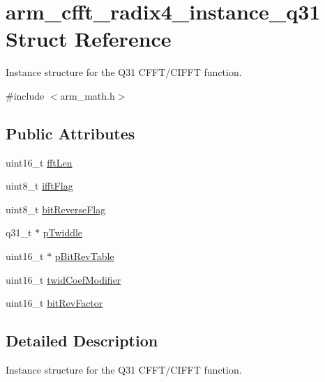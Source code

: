 \hypertarget{structarm__cfft__radix4__instance__q31}{\section{arm\-\_\-cfft\-\_\-radix4\-\_\-instance\-\_\-q31 Struct Reference}
\label{structarm__cfft__radix4__instance__q31}
}


Instance structure for the Q31 C\-F\-F\-T/\-C\-I\-F\-F\-T function.  




{\ttfamily \#include $<$arm\-\_\-math.\-h$>$}

\subsection*{Public Attributes}
\begin{DoxyCompactItemize}
\item 
uint16\-\_\-t \hyperlink{structarm__cfft__radix4__instance__q31_ab413d2a5d3f45fa187d93813bf3bf81b}{fft\-Len}
\item 
uint8\-\_\-t \hyperlink{structarm__cfft__radix4__instance__q31_adc0a62ba669ad2282ecbe43d5d96abab}{ifft\-Flag}
\item 
uint8\-\_\-t \hyperlink{structarm__cfft__radix4__instance__q31_a5a7c4f4c7b3fb655cbb2bc11ef160a2a}{bit\-Reverse\-Flag}
\item 
q31\-\_\-t $\ast$ \hyperlink{structarm__cfft__radix4__instance__q31_a561c22dee4cbdcfa0fd5f15106ecc306}{p\-Twiddle}
\item 
uint16\-\_\-t $\ast$ \hyperlink{structarm__cfft__radix4__instance__q31_a33a3bc774c97373261699463c05dfe54}{p\-Bit\-Rev\-Table}
\item 
uint16\-\_\-t \hyperlink{structarm__cfft__radix4__instance__q31_a8cf8187b8232815cf17ee82bf572ecf9}{twid\-Coef\-Modifier}
\item 
uint16\-\_\-t \hyperlink{structarm__cfft__radix4__instance__q31_a94d2fead4efa4d5eaae142bbe30b0e15}{bit\-Rev\-Factor}
\end{DoxyCompactItemize}


\subsection{Detailed Description}
Instance structure for the Q31 C\-F\-F\-T/\-C\-I\-F\-F\-T function. 

